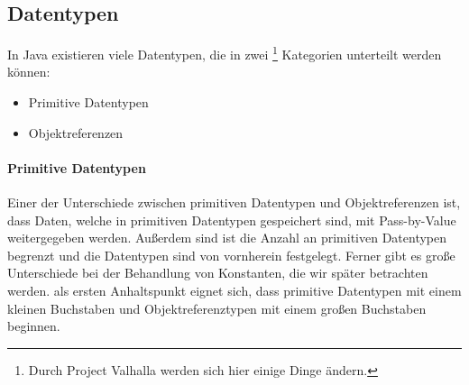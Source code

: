 \subsection{Datentypen}
	
	
	In Java existieren viele Datentypen, die in zwei \footnote{Durch Project Valhalla  werden sich hier einige Dinge ändern.} Kategorien unterteilt werden können: 
	\begin{itemize}
		\item Primitive Datentypen
		\item Objektreferenzen
	\end{itemize}
	
	\paragraph{Primitive Datentypen}
		Einer der Unterschiede zwischen primitiven Datentypen und Objektreferenzen ist, dass Daten, welche in primitiven Datentypen gespeichert sind, mit Pass-by-Value weitergegeben werden.  Außerdem sind ist die Anzahl an primitiven Datentypen begrenzt und die Datentypen sind von vornherein festgelegt. Ferner gibt es große Unterschiede bei der Behandlung von Konstanten, die wir später betrachten werden.  als ersten Anhaltspunkt eignet sich, dass primitive Datentypen mit einem kleinen Buchstaben und Objektreferenztypen mit einem großen Buchstaben beginnen.
		
